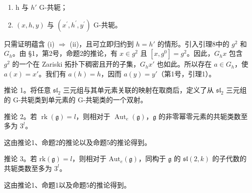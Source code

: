 \begin{enumerate}
\def\labelenumi{(\roman{enumi})}
\item
  h 与 \(h'\) G-共轭；
\item
  \((x,h,y)\) 与 \((x^{\prime},h^{\prime},y^{\prime})\) G-共轭。
\end{enumerate}

只需证明蕴含 (i) \(\Longrightarrow\) (ii)，且可立即归约到 \(h = h'\) 的情形。引入引理8中的 \(g^{2}\) 和 \(G_{h}\)。由 §1，第2号，命题2的推论，有 \(x \in g^{2}\) 且 \([x, g^{0}] = g^{2}\)。因此，\(G_{h}x\) 包含 \(g^{2}\) 的一个在 Zariski 拓扑下稠密且开的子集，\(G_{h}x'\) 也如此。所以存在 \(a \in G_{h}\)，使 \(a(x) = x'\)。我们有 \(a(h) = h\)，因而 \(a(y) = y'\)（第1号，引理1）。

推论 1。将任意 \(\mathfrak{sl}_2\) 三元组与其单元素关联的映射在取商后，定义了从 \(\mathfrak{sl}_2\) 三元组的 G-共轭类到单元素的 G-共轭类的一个双射。

推论 2。若 \(\operatorname{rk}(\mathfrak{g}) = l\)，则相对于 \(\operatorname{Aut}_e(\mathfrak{g})\)，\(\mathfrak{g}\) 的非零幂零元素的共轭类数至多为 \(3^l\)。

这由推论1、命题2的推论以及命题5的推论得到。

推论 3。若 \(\mathrm{rk}(\mathfrak{g}) = l\)，则相对于 \(\mathrm{Aut}_e(\mathfrak{g})\)，同构于 \(\mathfrak{g}\) 的 \(\mathfrak{sl}(2,k)\) 的子代数的共轭类数至多为 \(3^l\)。

这由推论1、命题1以及命题5的推论得到。

